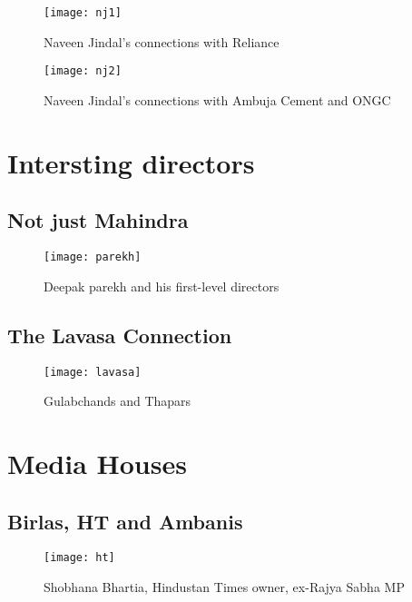 \begin{figure}[H]
\begin{center}  
\texttt{[image: nj1]} 
\caption{Naveen Jindal's connections with Reliance}
\label{fig:nj1}
\end{center}
\end{figure}

\begin{figure}[H]
\begin{center}  
\texttt{[image: nj2]} 
\caption{Naveen Jindal's connections with Ambuja Cement and ONGC}
\label{fig:nj2}
\end{center}
\end{figure}


\section{Intersting directors}

\subsection{Not just Mahindra}
\begin{figure}[H]
\begin{center}  
\texttt{[image: parekh]} 
\caption{Deepak parekh and his first-level directors}
\label{fig:parekh}
\end{center}
\end{figure}


\subsection{The Lavasa Connection}
\begin{figure}[H]
\begin{center}  
\texttt{[image: lavasa]} 
\caption{Gulabchands and Thapars}
\label{fig:lavasa}
\end{center}
\end{figure}


\section{Media Houses}

\subsection{Birlas, HT and Ambanis}

\begin{figure}[H]
\begin{center}  
\texttt{[image: ht]} 
\caption{Shobhana Bhartia, Hindustan Times owner, ex-Rajya Sabha MP}
\label{fig:ht}
\end{center}
\end{figure}

